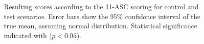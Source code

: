 \begin{figure}
    \centering
    \ifgraphics
    \fi
    \caption{
        Resulting scores according to the \ac{11-ASC} scoring for control and test scenarios.
        Error bars show the 95\% confidence interval of the true mean, assuming normal distribution.
        Statistical significance indicated with \raisebox{-0.7ex}{*} ($p < 0.05$).
    }
    \label{fig:results-11-asc}
\end{figure}
